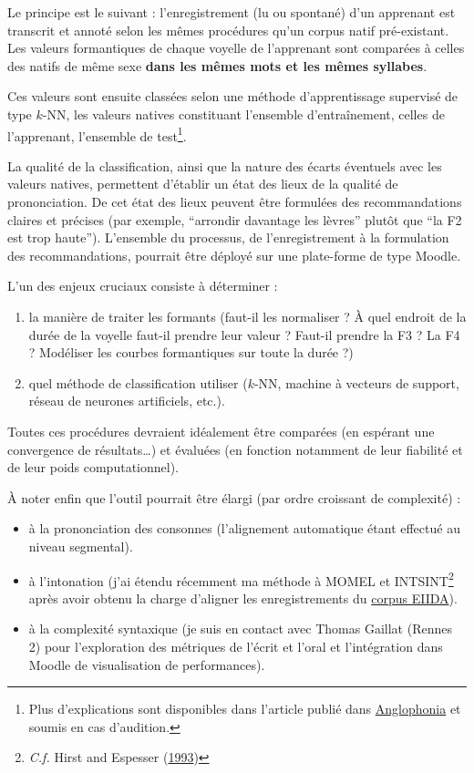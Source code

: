 \documentclass[
  10pt,
]{article}
\providecommand{\tightlist}{%
  \setlength{\itemsep}{0pt}\setlength{\parskip}{0pt}}
\begin{document}
Le principe est le suivant : l'enregistrement (lu ou spontané) d'un apprenant est transcrit et annoté selon les mêmes procédures qu'un corpus natif pré-existant.
Les valeurs formantiques de chaque voyelle de l'apprenant sont comparées à celles des natifs de même sexe \textbf{dans les mêmes mots et les mêmes syllabes}.

Ces valeurs sont ensuite classées selon une méthode d'apprentissage supervisé de type \(k\)-NN, les valeurs natives constituant l'ensemble d'entraînement, celles de l'apprenant, l'ensemble de test\footnote{Plus d'explications sont disponibles dans l'article publié dans \protect\hyperlink{anglophonia}{Anglophonia} et soumis en cas d'audition.}.

La qualité de la classification, ainsi que la nature des écarts éventuels avec les valeurs natives, permettent d'établir un état des lieux de la qualité de prononciation. De cet état des lieux peuvent être formulées des recommandations claires et précises (par exemple, ``arrondir davantage les lèvres'' plutôt que ``la F2 est trop haute''). L'ensemble du processus, de l'enregistrement à la formulation des recommandations, pourrait être déployé sur une plate-forme de type Moodle.

L'un des enjeux cruciaux consiste à déterminer :

\begin{enumerate}
\def\labelenumi{\arabic{enumi}.}
\tightlist
\item
  la manière de traiter les formants (faut-il les normaliser ? À quel endroit de la durée de la voyelle faut-il prendre leur valeur ? Faut-il prendre la F3 ? La F4 ? Modéliser les courbes formantiques sur toute la durée ?)
\item
  quel méthode de classification utiliser (\(k\)-NN, machine à vecteurs de support, réseau de neurones artificiels, etc.).
\end{enumerate}

Toutes ces procédures devraient idéalement être comparées (en espérant une convergence de résultats\ldots) et évaluées (en fonction notamment de leur fiabilité et de leur poids computationnel).

À noter enfin que l'outil pourrait être élargi (par ordre croissant de complexité) :

\begin{itemize}
\item
  à la prononciation des consonnes (l'alignement automatique étant effectué au niveau segmental).
\item
  à l'intonation (j'ai étendu récemment ma méthode à MOMEL et INTSINT\footnote{\emph{C.f.} Hirst and Espesser (\protect\hyperlink{ref-hirst1993}{1993})} après avoir obtenu la charge d'aligner les enregistrements du \href{http://www.transfers.ens.fr/eiida-etudes-interdisciplinaires-et-interlinguistiques-du-discours-academique}{corpus EIIDA}).
\item
  à la complexité syntaxique (je suis en contact avec Thomas Gaillat (Rennes 2)
  pour l'exploration des métriques de l'écrit et l'oral et l'intégration dans Moodle de visualisation de performances).
\end{itemize}
\end{document}
